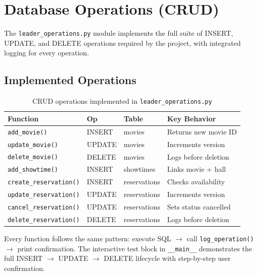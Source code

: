\documentclass[12pt]{article}
\begin{document}
\section{Database Operations (CRUD)}

The \texttt{leader\_operations.py} module implements the full suite of INSERT, UPDATE, and DELETE operations required by the project, with integrated logging for every operation.

\subsection{Implemented Operations}

\begin{table}[H]
\centering
\small
\begin{tabular}{p{3.8cm} l l p{4cm}}
\toprule
\textbf{Function} & \textbf{Op} & \textbf{Table} & \textbf{Key Behavior} \\
\midrule
\texttt{add\_movie()} & INSERT & movies & Returns new movie ID \\
\texttt{update\_movie()} & UPDATE & movies & Increments version \\
\texttt{delete\_movie()} & DELETE & movies & Logs before deletion \\
\texttt{add\_showtime()} & INSERT & showtimes & Links movie + hall \\
\texttt{create\_reservation()} & INSERT & reservations & Checks availability \\
\texttt{update\_reservation()} & UPDATE & reservations & Increments version \\
\texttt{cancel\_reservation()} & UPDATE & reservations & Sets status cancelled \\
\texttt{delete\_reservation()} & DELETE & reservations & Logs before deletion \\
\bottomrule
\end{tabular}
\caption{CRUD operations implemented in \texttt{leader\_operations.py}}
\end{table}

Every function follows the same pattern: execute SQL $\rightarrow$ call \texttt{log\_operation()} $\rightarrow$ print confirmation. The interactive test block in \texttt{\_\_main\_\_} demonstrates the full INSERT $\rightarrow$ UPDATE $\rightarrow$ DELETE lifecycle with step-by-step user confirmation.
\end{document}
